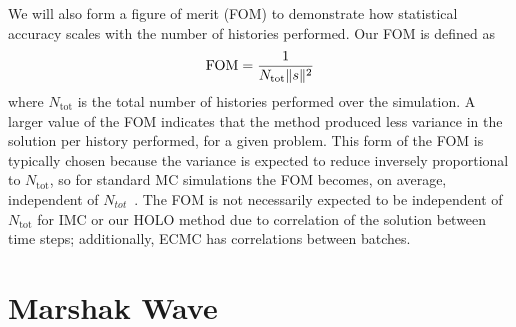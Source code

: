 We will also form a figure of merit (FOM) to demonstrate how statistical accuracy
scales with the number of histories performed.  Our FOM is defined as
\begin{equation}\label{eq:fom}
    \text{FOM} = \frac{1}{N_{\text{tot}}\|s\|^2}
\end{equation}
where $N_{\text{tot}}$ is the total number of histories performed over the simulation.
A larger value of the FOM indicates that the method produced less variance in the
solution per history performed, for a given problem.  This form of the FOM
is typically chosen because the variance is expected to reduce inversely proportional
to $N_{\text{tot}}$, so for standard MC simulations the FOM becomes, on average, independent of
$N_{tot}$~\cite{shultis_mc}.  The FOM is not necessarily expected to be independent
of $N_{\text{tot}}$ for IMC or
our HOLO method due to correlation of the solution between time steps; additionally, ECMC
has correlations between batches.

\section{Marshak Wave}
\label{sec:marsh}

